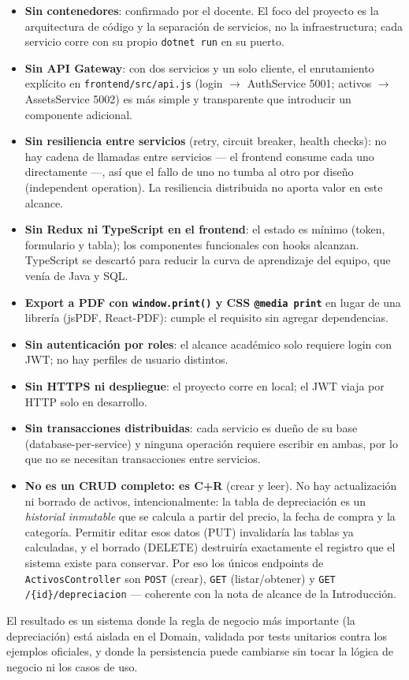 \documentclass[11pt,a4paper]{article}
\begin{document}
\begin{itemize}
    \item \textbf{Sin contenedores}: confirmado por el docente. El foco del
    proyecto es la arquitectura de código y la separación de servicios, no la
    infraestructura; cada servicio corre con su propio \texttt{dotnet run} en
    su puerto.
    \item \textbf{Sin API Gateway}: con dos servicios y un solo cliente, el
    enrutamiento explícito en \texttt{frontend/src/api.js} (login $\rightarrow$
    AuthService 5001; activos $\rightarrow$ AssetsService 5002) es más simple
    y transparente que introducir un componente adicional.
    \item \textbf{Sin resiliencia entre servicios} (retry, circuit breaker,
    health checks): no hay cadena de llamadas entre servicios — el frontend
    consume cada uno directamente —, así que el fallo de uno no tumba al otro
    por diseño (independent operation). La resiliencia distribuida no aporta
    valor en este alcance.
    \item \textbf{Sin Redux ni TypeScript en el frontend}: el estado es
    mínimo (token, formulario y tabla); los componentes funcionales con hooks
    alcanzan. TypeScript se descartó para reducir la curva de aprendizaje del
    equipo, que venía de Java y SQL.
    \item \textbf{Export a PDF con \texttt{window.print()} y CSS
    \texttt{@media print}} en lugar de una librería (jsPDF, React-PDF):
    cumple el requisito sin agregar dependencias.
    \item \textbf{Sin autenticación por roles}: el alcance académico solo
    requiere login con JWT; no hay perfiles de usuario distintos.
    \item \textbf{Sin HTTPS ni despliegue}: el proyecto corre en local; el
    JWT viaja por HTTP solo en desarrollo.
    \item \textbf{Sin transacciones distribuidas}: cada servicio es dueño de
    su base (database-per-service) y ninguna operación requiere escribir en
    ambas, por lo que no se necesitan transacciones entre servicios.
    \item \textbf{No es un CRUD completo: es C+R} (crear y leer). No hay
    actualización ni borrado de activos, intencionalmente: la tabla de
    depreciación es un \emph{historial inmutable} que se calcula a partir del
    precio, la fecha de compra y la categoría. Permitir editar esos datos
    (PUT) invalidaría las tablas ya calculadas, y el borrado (DELETE)
    destruiría exactamente el registro que el sistema existe para conservar.
    Por eso los únicos endpoints de \texttt{ActivosController} son
    \texttt{POST} (crear), \texttt{GET} (listar/obtener) y \texttt{GET
    /\{id\}/depreciacion} — coherente con la nota de alcance de la
    Introducción.
\end{itemize}

El resultado es un sistema donde la regla de negocio más importante (la
depreciación) está aislada en el Domain, validada por tests unitarios contra
los ejemplos oficiales, y donde la persistencia puede cambiarse sin tocar la
lógica de negocio ni los casos de uso.
\end{document}
